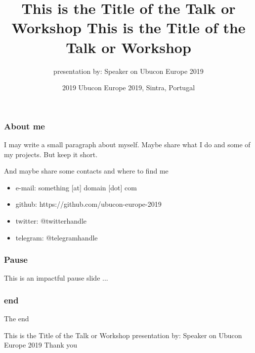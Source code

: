 \documentclass{beamer}
\title{This is the Title of the Talk or Workshop
}
\author{presentation by: Speaker on Ubucon Europe 2019}
\institute{Ubucon Europe}
\date{2019 }
\begin{document}
\frame{\titlepage}
 
\begin{frame}
\frametitle{About me}
I may write a small paragraph about myself. Maybe share what I do and some of my projects. But keep it short.

And maybe share some contacts and where to find me

\begin{itemize}
\item{} e-mail: something [at] domain [dot] com
\item{} github: https://github.com/ubucon-europe-2019
\item{} twitter: @twitterhandle
\item{} telegram: @telegramhandle
\end{itemize}
\end{frame}


\begin{frame}

\frametitle{Pause}
This is an impactful pause slide ...
\end{frame}

\begin{frame}
\frametitle{end}
The end
\end{frame}



\date[October 2019] %
{Ubucon Europe 2019, Sintra, Portugal}

 \title{This is the Title of the Talk or Workshop
}

This is the Title of the Talk or Workshop
presentation by: Speaker on Ubucon Europe 2019
Thank you
\end{document}
